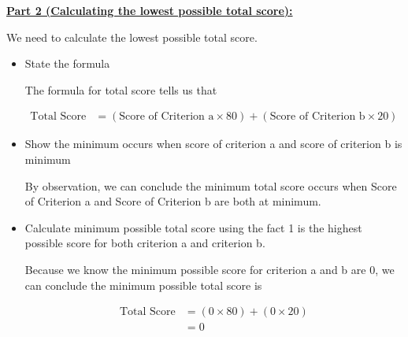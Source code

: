\documentclass[12pt]{article}
\begin{document}
\begin{mdframed}
\begin{itemize}
\begin{mdframed}
        \end{mdframed}
    \end{itemize}

    \bigskip

    \underline{\textbf{Part 2 (Calculating the lowest possible total score):}}

    \bigskip

    We need to calculate the lowest possible total score.

    \bigskip

    \begin{itemize}
        \item State the formula
        \begin{mdframed}
        The formula for total score tells us that

        \begin{align}
            \text{Total Score} &= (\text{Score of Criterion a} \times 80) + (\text{Score of Criterion b} \times 20)
        \end{align}
        \end{mdframed}

        \item Show the minimum occurs when score of criterion a and score of criterion b is minimum

        \begin{mdframed}
        By observation, we can conclude the minimum total score occurs when Score of Criterion a
        and Score of Criterion b are both at minimum.
        \end{mdframed}

        \item Calculate minimum possible total score using the fact 1 is the highest possible score
        for both criterion a and criterion b.

        \begin{mdframed}
            Because we know the minimum possible score for criterion a and b are 0,
            we can conclude the minimum possible total score is

            \begin{align}
                \text{Total Score} &= (0 \times 80) + (0 \times 20)\\
                &= 0
            \end{align}
        \end{mdframed}
    \end{itemize}
\end{mdframed}
\end{document}
